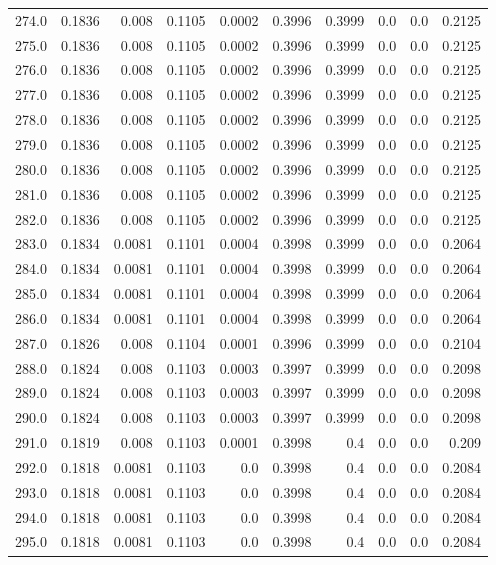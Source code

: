 \begin{longtable}{lrrrrrrrrr}
274.0 & 0.1836 & 0.008 & 0.1105 & 0.0002 & 0.3996 & 0.3999 & 0.0 & 0.0 & 0.2125 \\
275.0 & 0.1836 & 0.008 & 0.1105 & 0.0002 & 0.3996 & 0.3999 & 0.0 & 0.0 & 0.2125 \\
276.0 & 0.1836 & 0.008 & 0.1105 & 0.0002 & 0.3996 & 0.3999 & 0.0 & 0.0 & 0.2125 \\
277.0 & 0.1836 & 0.008 & 0.1105 & 0.0002 & 0.3996 & 0.3999 & 0.0 & 0.0 & 0.2125 \\
278.0 & 0.1836 & 0.008 & 0.1105 & 0.0002 & 0.3996 & 0.3999 & 0.0 & 0.0 & 0.2125 \\
279.0 & 0.1836 & 0.008 & 0.1105 & 0.0002 & 0.3996 & 0.3999 & 0.0 & 0.0 & 0.2125 \\
280.0 & 0.1836 & 0.008 & 0.1105 & 0.0002 & 0.3996 & 0.3999 & 0.0 & 0.0 & 0.2125 \\
281.0 & 0.1836 & 0.008 & 0.1105 & 0.0002 & 0.3996 & 0.3999 & 0.0 & 0.0 & 0.2125 \\
282.0 & 0.1836 & 0.008 & 0.1105 & 0.0002 & 0.3996 & 0.3999 & 0.0 & 0.0 & 0.2125 \\
283.0 & 0.1834 & 0.0081 & 0.1101 & 0.0004 & 0.3998 & 0.3999 & 0.0 & 0.0 & 0.2064 \\
284.0 & 0.1834 & 0.0081 & 0.1101 & 0.0004 & 0.3998 & 0.3999 & 0.0 & 0.0 & 0.2064 \\
285.0 & 0.1834 & 0.0081 & 0.1101 & 0.0004 & 0.3998 & 0.3999 & 0.0 & 0.0 & 0.2064 \\
286.0 & 0.1834 & 0.0081 & 0.1101 & 0.0004 & 0.3998 & 0.3999 & 0.0 & 0.0 & 0.2064 \\
287.0 & 0.1826 & 0.008 & 0.1104 & 0.0001 & 0.3996 & 0.3999 & 0.0 & 0.0 & 0.2104 \\
288.0 & 0.1824 & 0.008 & 0.1103 & 0.0003 & 0.3997 & 0.3999 & 0.0 & 0.0 & 0.2098 \\
289.0 & 0.1824 & 0.008 & 0.1103 & 0.0003 & 0.3997 & 0.3999 & 0.0 & 0.0 & 0.2098 \\
290.0 & 0.1824 & 0.008 & 0.1103 & 0.0003 & 0.3997 & 0.3999 & 0.0 & 0.0 & 0.2098 \\
291.0 & 0.1819 & 0.008 & 0.1103 & 0.0001 & 0.3998 & 0.4 & 0.0 & 0.0 & 0.209 \\
292.0 & 0.1818 & 0.0081 & 0.1103 & 0.0 & 0.3998 & 0.4 & 0.0 & 0.0 & 0.2084 \\
293.0 & 0.1818 & 0.0081 & 0.1103 & 0.0 & 0.3998 & 0.4 & 0.0 & 0.0 & 0.2084 \\
294.0 & 0.1818 & 0.0081 & 0.1103 & 0.0 & 0.3998 & 0.4 & 0.0 & 0.0 & 0.2084 \\
295.0 & 0.1818 & 0.0081 & 0.1103 & 0.0 & 0.3998 & 0.4 & 0.0 & 0.0 & 0.2084 \\

\end{longtable}
